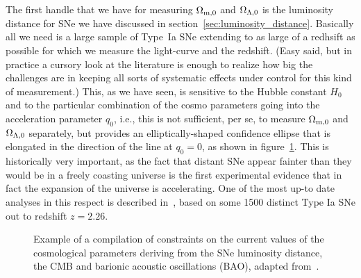 The first handle that we have for measuring $\Omega_\text{m,0}$ and $\Omega_{\Lambda,0}$ is the
luminosity distance for SNe we have discussed in section~\ref{sec:luminosity_distance}.
Basically all we need is a large sample of Type~Ia SNe extending to as large of a
redhsift as possible for which we measure the light-curve and the redshift. (Easy said,
but in practice a cursory look at the literature is enough to realize how big the
challenges are in keeping all sorts of systematic effects under control for this kind
of measurement.) This, as we have seen, is sensitive to the Hubble constant $H_0$ and to
the particular combination of the cosmo parameters going into the acceleration
parameter $q_0$, i.e., this is
not sufficient, per se, to measure $\Omega_\text{m,0}$ and $\Omega_{\Lambda,0}$ separately,
but provides an elliptically-shaped confidence ellipse that is elongated in the
direction of the line at $q_0 = 0$, as shown in figure~\ref{fig:cosmo_constraints}.
This is historically very important, as the fact that distant SNe appear fainter
than they would be in a freely coasting universe is the first experimental evidence
that in fact the expansion of the universe is accelerating. One of the most up-to date
analyses in this respect is described in~\cite{2022ApJ...938..110B}, based on some
1500 distinct Type Ia SNe out to redshift $z = 2.26$.

\begin{figure}[!htbp]
  
  \caption{Example of a compilation of constraints on the current values of the
  cosmological parameters deriving from the SNe luminosity distance, the CMB and
  barionic acoustic oscillations (BAO), adapted from~\cite{2012ApJ...746...85S}.}
  \label{fig:cosmo_constraints}
\end{figure}

